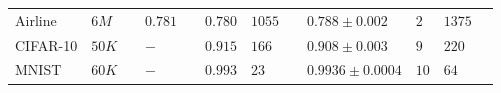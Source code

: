 \documentclass[a0,portrait]{a0poster}
\begin{document}
\begin{multicols}{2}
\begin{center}
\begin{tabular}{lll ll llll lll}

      Airline & $6M$ && 
      $0.781$ && $0.780$ & $1055$ &&
      $\mathbf{0.788 \pm 0.002}$ & $2$ & $1375$\\

      CIFAR-10 & $50 K$ && 
      $-$ && $\mathbf{0.915}$ & $166$ &&
      $0.908 \pm 0.003$ & $9$ & $220$\\

      MNIST & $60K$ && 
      $-$ && $0.993$ & $23$ &&
      $\mathbf{0.9936 \pm 0.0004}$ & $10$ & $64$\\
      \bottomrule
    \end{tabular}
\end{center}






\end{multicols}
\end{document}
